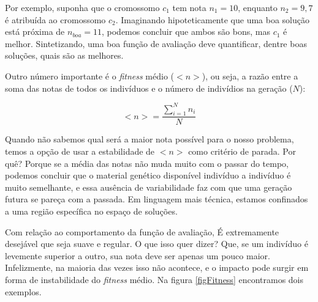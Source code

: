 	Por exemplo, suponha que o cromossomo $c_1$ tem nota $n_1 = 10$, enquanto $n_2 = 9,7$ é atribuída ao cromossomo $c_2$. Imaginando hipoteticamente que uma boa solução está próxima de $n_{boa} = 11$, podemos concluir que ambos são bons, mas $c_1$ é melhor. Sintetizando, uma boa função de avaliação deve quantificar, dentre boas soluções, quais são as melhores.
	
	Outro número importante é o \textit{fitness} médio ($<n>$), ou seja, a razão entre a soma das notas de todos os indivíduos e o número de indivídios na geração ($N$):
	
	\begin{equation}\label{fitness_medio}
		<n> = \frac{\sum_{i = 1}^{N} n_i}{N}
	\end{equation}
	
	
	Quando não sabemos qual será a maior nota possível para o nosso problema, temos a opção de usar a estabilidade de $<n>$ como critério de parada. Por quê? Porque se a média das notas não muda muito com o passar do tempo, podemos concluir que o material genético disponível indivíduo a indivíduo é muito semelhante, e essa ausência de variabilidade faz com que uma geração futura se pareça com a passada. Em linguagem mais técnica, estamos confinados a uma região específica no espaço de soluções.
	
	Com relação ao comportamento da função de avaliação, É extremamente desejável que  seja suave e regular. O que isso quer dizer? Que, se um indivíduo é levemente superior a outro, sua nota deve ser apenas um pouco maior. Infelizmente, na maioria das vezes isso não acontece, e o impacto pode surgir em forma de instabilidade do \textit{fitness} médio. Na figura \ref{figFitness} encontramos dois exemplos.

